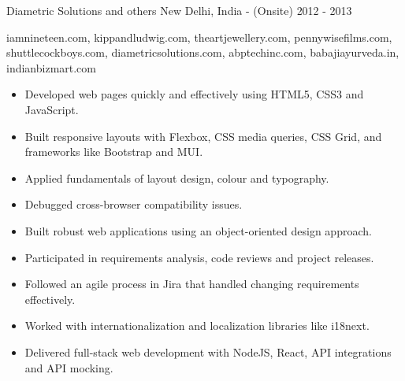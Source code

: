 \begin{projects}
    \newpage
    
    \project
    {Diametric Solutions and others} {New Delhi, India - (Onsite)} {2012 - 2013}
    {}
    {iamnineteen.com, kippandludwig.com, theartjewellery.com, pennywisefilms.com, shuttlecockboys.com, diametricsolutions.com, abptechinc.com, babajiayurveda.in, indianbizmart.com
    {\begin{itemize}
        \item Developed web pages quickly and effectively using HTML5, CSS3 and JavaScript.
        \item Built responsive layouts with Flexbox, CSS media queries, CSS Grid, and frameworks like Bootstrap and MUI.
        \item Applied fundamentals of layout design, colour and typography.
        \item Debugged cross-browser compatibility issues.
        \item Built robust web applications using an object-oriented design approach.
        \item Participated in requirements analysis, code reviews and project releases.
        \item Followed an agile process in Jira that handled changing requirements effectively.
        \item Worked with internationalization and localization libraries like i18next.
        \item Delivered full-stack web development with NodeJS, React, API integrations and API mocking.
    \end{itemize}} }
    {}
\end{projects}
